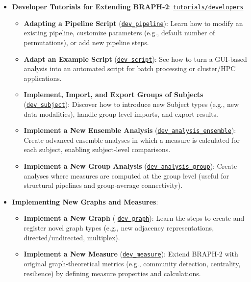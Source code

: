 \documentclass[justified]{tufte-handout}
\begin{document}
\begin{itemize}
\begin{itemize}
    \item \textbf{Developer Tutorials for Extending BRAPH-2}: 
    \href{https://github.com/braph-software/BRAPH-2/tree/develop/tutorials/developers}{\texttt{tutorials/developers}}
    \begin{itemize}
        \item \textbf{Adapting a Pipeline Script} (\href{https://github.com/braph-software/BRAPH-2/tree/develop/tutorials/developers/dev_pipeline}{\texttt{dev\_pipeline}}):  
        Learn how to modify an existing pipeline, customize parameters (e.g., default number of permutations), or add new pipeline steps.
        \item \textbf{Adapt an Example Script} (\href{https://github.com/braph-software/BRAPH-2/tree/develop/tutorials/developers/dev_script}{\texttt{dev\_script}}):  
        See how to turn a GUI-based analysis into an automated script for batch processing or cluster/HPC applications.
        \item \textbf{Implement, Import, and Export Groups of Subjects} (\href{https://github.com/braph-software/BRAPH-2/tree/develop/tutorials/developers/dev_subject}{\texttt{dev\_subject}}):  
        Discover how to introduce new Subject types (e.g., new data modalities), handle group-level imports, and export results.
        \item \textbf{Implement a New Ensemble Analysis} (\href{https://github.com/braph-software/BRAPH-2/tree/develop/tutorials/developers/dev_analysis_ensemble}{\texttt{dev\_analysis\_ensemble}}):  
        Create advanced ensemble analyses in which a measure is calculated for each subject, enabling subject-level comparisons.
        \item \textbf{Implement a New Group Analysis} (\href{https://github.com/braph-software/BRAPH-2/tree/develop/tutorials/developers/dev_analysis_group}{\texttt{dev\_analysis\_group}}):  
        Create analyses where measures are computed at the group level (useful for structural pipelines and group-average connectivity).
    \end{itemize}

    \item \textbf{Implementing New Graphs and Measures}: 
    \begin{itemize}
        \item \textbf{Implement a New Graph} ( \href{https://github.com/braph-software/BRAPH-2/tree/develop/tutorials/developers/dev_graph}{\texttt{dev\_graph}}):  
        Learn the steps to create and register novel graph types (e.g., new adjacency representations, directed/undirected, multiplex).
        \item \textbf{Implement a New Measure} (\href{https://github.com/braph-software/BRAPH-2/tree/develop/tutorials/developers/dev_measure}{\texttt{dev\_measure}}):
        Extend BRAPH-2 with original graph-theoretical metrics (e.g., community detection, centrality, resilience) by defining measure properties and calculations.
    \end{itemize}


\end{itemize}
\end{itemize}
\end{document}
